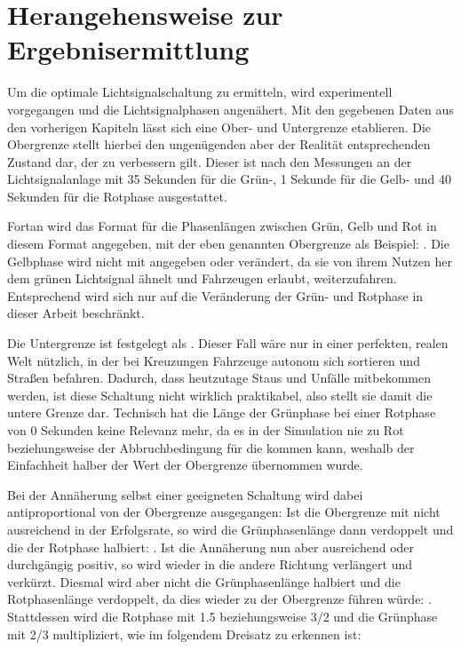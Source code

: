 %


\section{Herangehensweise zur Ergebnisermittlung}\label{sec:approach}

Um die optimale Lichtsignalschaltung zu ermitteln, wird experimentell vorgegangen und die Lichtsignalphasen angenähert.
Mit den gegebenen Daten aus den vorherigen Kapiteln lässt sich eine Ober- und Untergrenze etablieren.
Die Obergrenze stellt hierbei den ungenügenden aber der Realität entsprechenden Zustand dar, der zu verbessern gilt.
Dieser ist nach den Messungen an der Lichtsignalanlage mit 35 Sekunden für die Grün-, 1 Sekunde für die Gelb- und 40 Sekunden für die Rotphase ausgestattet.

Fortan wird das Format für die Phasenlängen zwischen Grün, Gelb und Rot in diesem Format angegeben, mit der eben genannten Obergrenze als Beispiel: .
Die Gelbphase wird nicht mit angegeben oder verändert, da sie von ihrem Nutzen her dem grünen Lichtsignal ähnelt und Fahrzeugen erlaubt, weiterzufahren.
Entsprechend wird sich nur auf die Veränderung der Grün- und Rotphase in dieser Arbeit beschränkt.

Die Untergrenze ist festgelegt als .
Dieser Fall wäre nur in einer perfekten, realen Welt nützlich, in der bei Kreuzungen Fahrzeuge autonom sich sortieren und Straßen befahren.
Dadurch, dass heutzutage Staus und Unfälle mitbekommen werden, ist diese Schaltung nicht wirklich praktikabel, also stellt sie damit die untere Grenze dar.
Technisch hat die Länge der Grünphase bei einer Rotphase von 0 Sekunden keine Relevanz mehr, da es in der Simulation nie zu Rot beziehungsweise der Abbruchbedingung für die  kommen kann, weshalb der Einfachheit halber der Wert der Obergrenze übernommen wurde.


Bei der Annäherung selbst einer geeigneten Schaltung wird dabei antiproportional von der Obergrenze ausgegangen:
Ist die Obergrenze mit  nicht ausreichend in der Erfolgsrate, so wird die Grünphasenlänge dann verdoppelt und die der Rotphase halbiert: .
Ist die Annäherung nun aber ausreichend oder durchgängig positiv, so wird wieder in die andere Richtung verlängert und verkürzt.
Diesmal wird aber nicht die Grünphasenlänge halbiert und die Rotphasenlänge verdoppelt, da dies wieder zu der Obergrenze führen würde:  .
Stattdessen wird die Rotphase mit 1.5 beziehungsweise 3/2 und die Grünphase mit 2/3 multipliziert, wie im folgendem Dreisatz zu erkennen ist:

